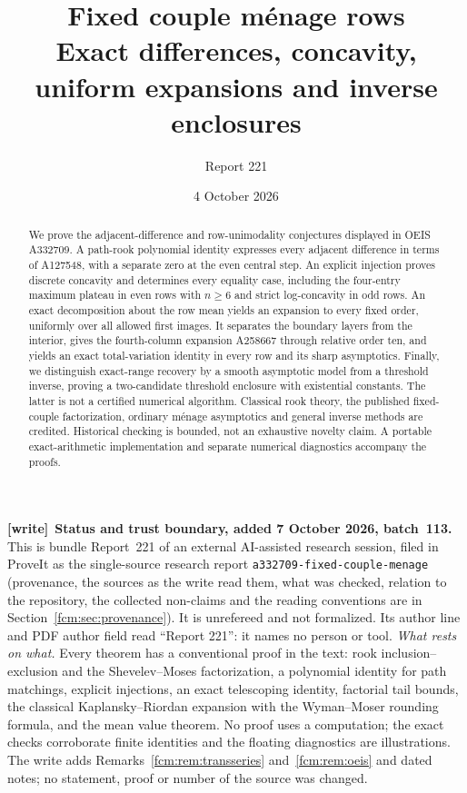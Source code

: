 \documentclass[11pt,letterpaper]{article}
\title{Fixed couple m\'enage rows\\\large Exact differences, concavity, uniform expansions and inverse enclosures}
\author{Report 221}
\date{4 October 2026}
\theoremstyle{remark}\newtheorem{remark}[theorem]{Remark}
\newcommand{\file}[1]{\nolinkurl{#1}}
\newenvironment{writenote}[1][]{\par\smallskip\begingroup\small
 \noindent\textbf{[write]}\if\relax\detokenize{#1}\relax\else~\textbf{#1.}\fi\ }%
 {\par\endgroup\smallskip}
\begin{document}
\maketitle
\begin{abstract}
We prove the adjacent-difference and row-unimodality conjectures displayed in OEIS A332709. A path-rook polynomial identity expresses every adjacent difference in terms of A127548, with a separate zero at the even central step. An explicit injection proves discrete concavity and determines every equality case, including the four-entry maximum plateau in even rows with $n\ge6$ and strict log-concavity in odd rows. An exact decomposition about the row mean yields an expansion to every fixed order, uniformly over all allowed first images. It separates the boundary layers from the interior, gives the fourth-column expansion A258667 through relative order ten, and yields an exact total-variation identity in every row and its sharp asymptotics. Finally, we distinguish exact-range recovery by a smooth asymptotic model from a threshold inverse, proving a two-candidate threshold enclosure with existential constants. The latter is not a certified numerical algorithm. Classical rook theory, the published fixed-couple factorization, ordinary m\'enage asymptotics and general inverse methods are credited. Historical checking is bounded, not an exhaustive novelty claim. A portable exact-arithmetic implementation and separate numerical diagnostics accompany the proofs.
\end{abstract}
\begin{writenote}[Status and trust boundary, added 7 October 2026, batch~113]
This is bundle Report~221 of an external AI-assisted research session, filed
in ProveIt as the single-source research report
\file{a332709-fixed-couple-menage} (provenance, the sources as the write read
them, what was checked, relation to the repository, the collected non-claims
and the reading conventions are in Section~\ref{fcm:sec:provenance}). It is
unrefereed and not formalized. Its author line and PDF author field read
``Report 221'': it names no person or tool. \emph{What rests on what.} Every
theorem has a conventional proof in the text: rook inclusion--exclusion and the
Shevelev--Moses factorization, a polynomial identity for path matchings,
explicit injections, an exact telescoping identity, factorial tail bounds, the
classical Kaplansky--Riordan expansion with the Wyman--Moser rounding formula,
and the mean value theorem. No proof uses a computation; the exact checks
corroborate finite identities and the floating diagnostics are illustrations.
The write adds Remarks~\ref{fcm:rem:transseries} and~\ref{fcm:rem:oeis} and
dated notes; no statement, proof or number of the source was changed.
\end{writenote}
\end{document}

